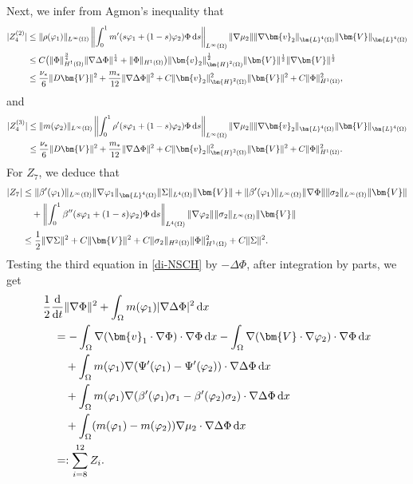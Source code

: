 \documentclass[11pt,reqno]{amsart}
\def\d{{\rm d}}
\def\H{\bm{H}}
\def\L{\bm{L}}
\def\vv{\bm{v}}
\begin{document}
Next, we infer from Agmon's inequality that
%
\begin{align*}
  |Z_4^{(2)}| &\leq  \|\rho(\varphi_1)\|_{L^\infty(\Omega)} \left\|\int_0^1m'(s\varphi_1+(1-s)\varphi_2)\Phi\,\d s\right\|_{L^\infty(\Omega)}\|\nabla \mu_2\|\|\nabla \vv_2\|_{\L^4(\Omega)}\|\bm{V}\|_{\L^4(\Omega)}
  \notag\\
  &\leq C \big(\|\Phi\|_{H^1(\Omega)}^\frac34 \|\nabla \Delta \Phi\|^\frac14
  + \|\Phi\|_{H^1(\Omega)}\big) \|\vv_2\|_{\H^2(\Omega)}^\frac12 \|\bm{V}\|^\frac12 \|\nabla\bm{V}\|^\frac12
  \notag\\
  &\leq \frac{\nu_*}{6}\|D\bm{V}\|^2
  + \frac{m_*}{12} \|\nabla \Delta \Phi\|^2
  + C \|\vv_2\|_{\H^2(\Omega)}^2\|\bm{V}\|^2+ C\|\Phi\|_{H^1(\Omega)}^2,
  \notag
\end{align*}
and
\begin{align*}
|Z_4^{(3)}|&\leq   \|m(\varphi_2)\|_{L^\infty(\Omega)} \left\|\int_0^1\rho'(s\varphi_1+(1-s)\varphi_2)\Phi\,\d s\right\|_{L^\infty(\Omega)}\|\nabla \mu_2\|\|\nabla \vv_2\|_{\L^4(\Omega)}\|\bm{V}\|_{\L^4(\Omega)}
  \notag\\
   &\leq \frac{\nu_*}{6}\|D\bm{V}\|^2
   + \frac{m_*}{12} \|\nabla \Delta \Phi\|^2
  + C \|\vv_2\|_{\H^2(\Omega)}^2 \|\bm{V}\|^2
  + C\|\Phi\|_{H^1(\Omega)}^2.
  \notag
\end{align*}
%
For $Z_7$, we deduce that
%
\begin{align*}
|Z_7|&\leq \|\beta'(\varphi_1)\|_{L^\infty(\Omega)}
\|\nabla \varphi_1\|_{\L^4(\Omega)}\|\Sigma\|_{L^4(\Omega)} \|\bm{V}\|
+ \|\beta'(\varphi_1)\|_{L^\infty(\Omega)} \|\nabla \Phi\| \|\sigma_2\|_{L^\infty(\Omega)} \|\bm{V}\|
\notag\\
&\quad + \left\|\int_0^1\beta''(s\varphi_1+(1-s)\varphi_2)\Phi\,\d s\right\|_{L^4(\Omega)}
\|\nabla \varphi_2\| \|\sigma_2\|_{L^\infty(\Omega)} \|\bm{V}\|
\notag\\
&\leq \frac{1}{2}\|\nabla \Sigma\|^2
+ C\|\bm{V}\|^2
+ C \|\sigma_2\|_{H^2(\Omega)} \|\Phi\|_{H^1(\Omega)}^2
 + C\|\Sigma\|^2.
\end{align*}
%
Testing the third equation in \eqref{di-NSCH} by $-\Delta \Phi$, after integration by parts, we get
%
\begin{align}
&  \frac12\frac{\d}{\d t} \|\nabla \Phi\|^2 +\int_\Omega m(\varphi_1)|\nabla \Delta \Phi|^2\,\d x
\notag\\
&\quad = -\int_\Omega \nabla (\vv_1\cdot \nabla \Phi)\cdot \nabla  \Phi\, \d x
- \int_\Omega \nabla (\bm{V}\cdot\nabla \varphi_2)\cdot \nabla \Phi\, \d x
\notag\\
&\qquad
+  \int_\Omega  m(\varphi_1) \nabla (\Psi'(\varphi_1)-\Psi'(\varphi_2))
\cdot \nabla \Delta \Phi\, \d x
\notag\\
&\qquad
+ \int_\Omega m(\varphi_1) \nabla (\beta'(\varphi_1) \sigma_1-\beta'(\varphi_2) \sigma_2)\cdot \nabla \Delta \Phi\,\d x
\notag\\
&\qquad
 + \int_\Omega (m(\varphi_1)-m(\varphi_2))\nabla \mu_2\cdot \nabla \Delta \Phi\, \d x
\notag\\
&\quad =:\sum_{i=8}^{12} Z_i.
\label{di-vphi}
\end{align}
\end{document}
